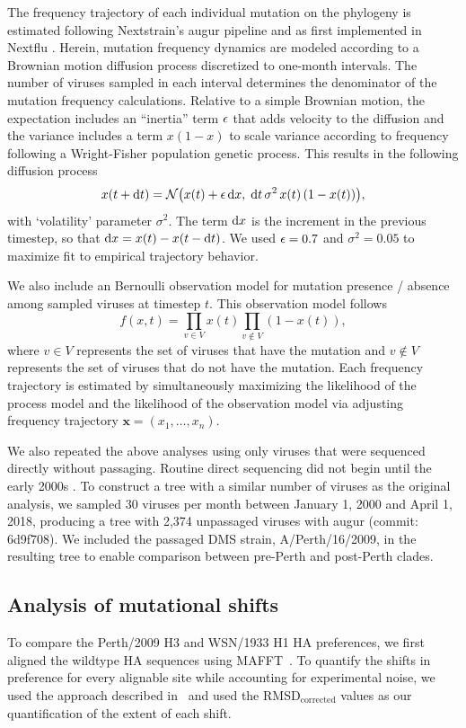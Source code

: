 \documentclass[9pt,twocolumn,twoside]{pnas-new}
\begin{document}
{The frequency trajectory of each individual mutation on the phylogeny is estimated following Nextstrain's augur pipeline and as first implemented in Nextflu \cite{neher2015nextflu}.
Herein, mutation frequency dynamics are modeled according to a Brownian motion diffusion process discretized to one-month intervals.
The number of viruses sampled in each interval determines the denominator of the mutation frequency calculations.
Relative to a simple Brownian motion, the expectation includes an ``inertia'' term $\epsilon$ that adds velocity to the diffusion and the variance includes a term $x(1-x)$ to scale variance according to frequency following a Wright-Fisher population genetic process.
This results in the following diffusion process
\begin{equation}
x(t+\mathrm{d}t) = \mathcal{N}\big( x(t) + \epsilon \, \mathrm{d}x , \; \mathrm{d}t \, \sigma^2 \, x(t) \, (1-x(t)) \big),
\end{equation}
with `volatility' parameter $\sigma^2$.
The term $\mathrm{d}x$ is the increment in the previous timestep, so that $\mathrm{d}x = x(t) - x(t-\mathrm{d}t)$.
We used $\epsilon = 0.7$ and $\sigma^2 = 0.05$ to maximize fit to empirical trajectory behavior.

We also include an Bernoulli observation model for mutation presence / absence among sampled viruses at timestep $t$.
This observation model follows
\begin{equation}
f(x,t) = \prod_{v\in V} x(t) \prod_{v\notin V} (1-x(t)),
\end{equation}
where $v\in V$ represents the set of viruses that have the mutation and $v\notin V$ represents the set of viruses that do not have the mutation.
Each frequency trajectory is estimated by simultaneously maximizing the likelihood of the process model and the likelihood of the observation model via adjusting frequency trajectory $\mathbf{x}=(x_1, \ldots, x_n)$.

We also repeated the above analyses using only viruses that were sequenced directly without passaging.
Routine direct sequencing did not begin until the early 2000s \cite{mcwhite2016sequence}.
To construct a tree with a similar number of viruses as the original analysis, we sampled 30 viruses per month between January 1, 2000 and April 1, 2018, producing a tree with 2,374 unpassaged viruses with augur (commit: 6d9f708).
We included the passaged DMS strain, A/Perth/16/2009, in the resulting tree to enable comparison between pre-Perth and post-Perth clades.

\subsection*{Analysis of mutational shifts}
To compare the Perth/2009 H3 and WSN/1933 H1 HA preferences, we first aligned the wildtype HA sequences using MAFFT~\cite{katoh2013mafft}.
To quantify the shifts in preference for every alignable site while accounting for experimental noise, we used the approach described in~\cite{haddox2018mapping} and used the RMSD$_{\text{corrected}}$ values as our quantification of the extent of each shift.

}
\end{document}
